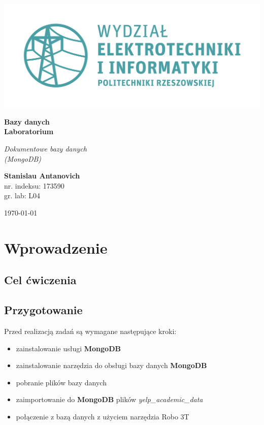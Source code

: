 \documentclass{article}
\begin{document}
\begin{titlepage}
\begin{center}
	\includegraphics[scale=0.7]{logo.png}

	\vspace*{4cm}
	\textbf{Bazy danych\\ Laboratorium}

	\vspace{1.5cm}
	\textit{Dokumentowe bazy danych\\ (MongoDB)}

	\vspace{1.5cm}
	\textbf{Stanislau Antanovich}\\
	nr. indeksu: 173590\\
	gr. lab: L04

	\vspace{4.5cm}
	\today
\end{center}
\end{titlepage}

\section{Wprowadzenie}

\subsection{Cel ćwiczenia}

\subsection{Przygotowanie}

Przed realizacją zadań są wymagane następujące kroki:

\begin{itemize}
\item zainstalowanie usługi \textbf{MongoDB}
\item zainstalowanie narzędzia do obsługi bazy danych \textbf{MongoDB}
\item pobranie plików bazy danych
\item zaimportowanie do \textbf{MongoDB} plików \emph{yelp\_academic\_data}
\item połączenie z bazą danych z użyciem narzędzia Robo 3T
\end{itemize}
\end{document}
